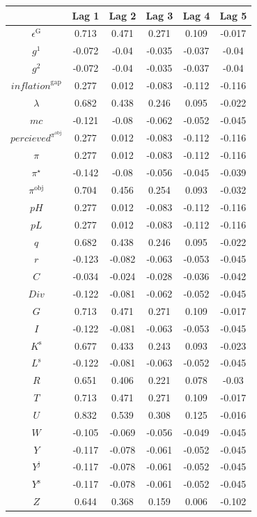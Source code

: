 \begin{tabular}{c|ccccc|}
  & Lag 1 & Lag 2 & Lag 3 & Lag 4 & Lag 5\\
\hline
$\epsilon^{\mathrm{G}}$ & 0.713 & 0.471 & 0.271 & 0.109 & -0.017 \\
$g^{\mathrm{1}}$ & -0.072 & -0.04 & -0.035 & -0.037 & -0.04 \\
$g^{\mathrm{2}}$ & -0.072 & -0.04 & -0.035 & -0.037 & -0.04 \\
${i\!n\!f\!l\!a\!t\!i\!o\!n}^{\mathrm{gap}}$ & 0.277 & 0.012 & -0.083 & -0.112 & -0.116 \\
$\lambda$ & 0.682 & 0.438 & 0.246 & 0.095 & -0.022 \\
${m\!c}$ & -0.121 & -0.08 & -0.062 & -0.052 & -0.045 \\
${p\!e\!r\!c\!i\!e\!v\!e\!d}^{\pi^{\mathrm{obj}}}$ & 0.277 & 0.012 & -0.083 & -0.112 & -0.116 \\
$\pi$ & 0.277 & 0.012 & -0.083 & -0.112 & -0.116 \\
$\pi^{\star}$ & -0.142 & -0.08 & -0.056 & -0.045 & -0.039 \\
$\pi^{\mathrm{obj}}$ & 0.704 & 0.456 & 0.254 & 0.093 & -0.032 \\
${p\!H}$ & 0.277 & 0.012 & -0.083 & -0.112 & -0.116 \\
${p\!L}$ & 0.277 & 0.012 & -0.083 & -0.112 & -0.116 \\
$q$ & 0.682 & 0.438 & 0.246 & 0.095 & -0.022 \\
$r$ & -0.123 & -0.082 & -0.063 & -0.053 & -0.045 \\
$C$ & -0.034 & -0.024 & -0.028 & -0.036 & -0.042 \\
${D\!i\!v}$ & -0.122 & -0.081 & -0.062 & -0.052 & -0.045 \\
$G$ & 0.713 & 0.471 & 0.271 & 0.109 & -0.017 \\
$I$ & -0.122 & -0.081 & -0.063 & -0.053 & -0.045 \\
$K^{\mathrm{s}}$ & 0.677 & 0.433 & 0.243 & 0.093 & -0.023 \\
$L^{\mathrm{s}}$ & -0.122 & -0.081 & -0.063 & -0.052 & -0.045 \\
$R$ & 0.651 & 0.406 & 0.221 & 0.078 & -0.03 \\
$T$ & 0.713 & 0.471 & 0.271 & 0.109 & -0.017 \\
$U$ & 0.832 & 0.539 & 0.308 & 0.125 & -0.016 \\
$W$ & -0.105 & -0.069 & -0.056 & -0.049 & -0.045 \\
$Y$ & -0.117 & -0.078 & -0.061 & -0.052 & -0.045 \\
$Y^{\mathrm{j}}$ & -0.117 & -0.078 & -0.061 & -0.052 & -0.045 \\
$Y^{\mathrm{s}}$ & -0.117 & -0.078 & -0.061 & -0.052 & -0.045 \\
$Z$ & 0.644 & 0.368 & 0.159 & 0.006 & -0.102 \\
\hline
\end{tabular}



